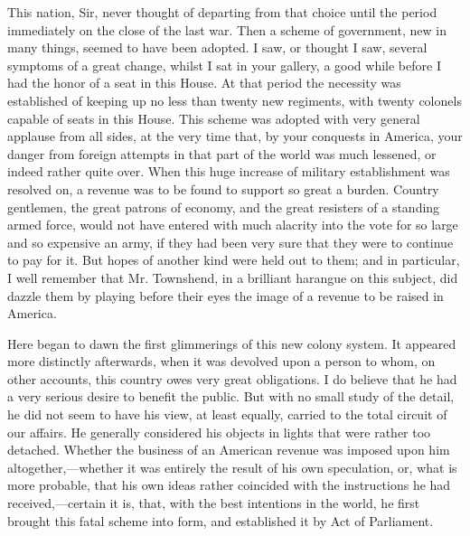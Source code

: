 This nation, Sir, never thought of departing from that choice until the period immediately on the close of the last war. Then a scheme of government, new in many things, seemed to have been adopted. I saw, or thought I saw, several symptoms of a great change, whilst I sat in your gallery, a good while before I had the honor of a seat in this House. At that period the necessity was established of keeping up no less than twenty new regiments, with twenty colonels capable of seats in this House. This scheme was adopted with very general applause from all sides, at the very time that, by your conquests in America, your danger from foreign attempts in that part of the world was much lessened, or indeed rather quite over. When this huge increase of military establishment was resolved on, a revenue was to be found to support so great a burden. Country gentlemen, the great patrons of economy, and the great resisters of a standing armed force, would not have entered with much alacrity into the vote for so large and so expensive an army, if they had been very sure that they were to continue to pay for it. But hopes of another kind were held out to them; and in particular, I well remember that Mr. Townshend, in a brilliant harangue on this subject, did dazzle them by playing before their eyes the image of a revenue to be raised in America.

Here began to dawn the first glimmerings of this new colony system. It appeared more distinctly afterwards, when it was devolved upon a person to whom, on other accounts, this country owes very great obligations. I do believe that he had a very serious desire to benefit the public. But with no small study of the detail, he did not seem to have his view, at least equally, carried to the total circuit of our affairs. He generally considered his objects in lights that were rather too detached. Whether the business of an American revenue was imposed upon him altogether,—whether it was entirely the result of his own speculation, or, what is more probable, that his own ideas rather coincided with the instructions he had received,—certain it is, that, with the best intentions in the world, he first brought this fatal scheme into form, and established it by Act of Parliament.

